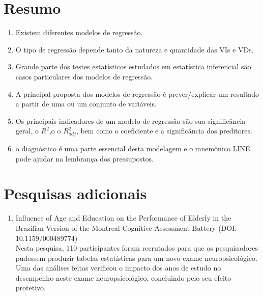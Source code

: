 \documentclass[
]{book}
\providecommand{\tightlist}{%
  \setlength{\itemsep}{0pt}\setlength{\parskip}{0pt}}
\begin{document}
\hypertarget{resumo-15}{%
\section{Resumo}\label{resumo-15}}

\begin{enumerate}
\def\labelenumi{\arabic{enumi}.}
\tightlist
\item
  Existem diferentes modelos de regressão.\\
\item
  O tipo de regressão depende tanto da natureza e quantidade das VIs e VDs.\\
\item
  Grande parte dos testes estatísticos estudados em estatística inferencial são casos particulares dos modelos de regressão.\\
\item
  A principal proposta dos modelos de regressão é prever/explicar um resultado a partir de uma ou um conjunto de variáveis.\\
\item
  Os principais indicadores de um modelo de regressão são sua significância geral, o \(R^2\),o o \(R^2_{adj}\), bem como o coeficiente e a significância dos preditores.\\
\item
  o diagnóstico é uma parte essencial desta modelagem e o mnemônico LINE pode ajudar na lembrança dos pressupostos.\\
\end{enumerate}

\hypertarget{pesquisas-adicionais-8}{%
\section{Pesquisas adicionais}\label{pesquisas-adicionais-8}}

\begin{enumerate}
\def\labelenumi{\arabic{enumi}.}
\tightlist
\item
  Influence of Age and Education on the Performance of Elderly in the Brazilian Version of the Montreal Cognitive Assessment Battery (DOI: 10.1159/000489774)\\
  Nesta pesquisa, 110 participantes foram recrutados para que os pesquisadores pudessem produzir tabelas estatísticas para um novo exame neuropsicológico. Uma das análises feitas verificou o impacto dos anos de estudo no desempenho neste exame neuropsicológico, concluindo pelo seu efeito protetivo.
\end{enumerate}
\end{document}
